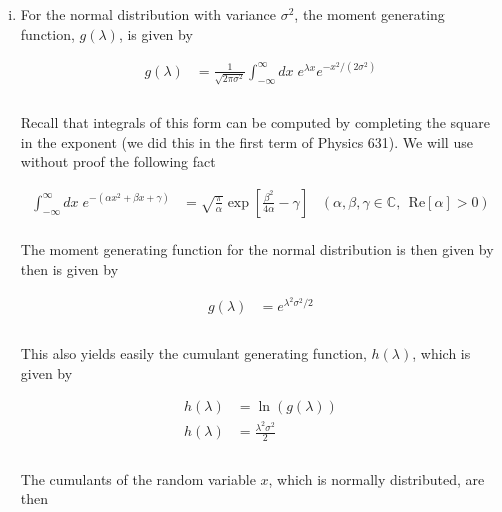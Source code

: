 \documentclass[]{article}
\begin{document}
\begin{enumerate}[i.]
\item For the normal distribution with variance $\sigma^2$, the moment generating function, $g(\lambda)$, is given by

\begin{equation}
\begin{aligned}
g( \lambda ) & = \frac{1}{  \sqrt{ 2 \pi \sigma^2} }\int_{-\infty}^{\infty} dx \; e^{ \lambda x} e^{- x^2/ (2\sigma^2)} \\
\end{aligned}
\end{equation}\\

Recall that integrals of this form can be computed by completing the square in the exponent (we did this in the first term of Physics 631). We will use without proof the following fact

\begin{equation}
\begin{aligned}
\int_{-\infty}^{\infty} dx \; e^{ - (\alpha x^2 + \beta x + \gamma)} & = \sqrt{ \frac{\pi}{\alpha} } \exp\left[ \frac{\beta^2}{4\alpha} - \gamma  \right] \; \; \; (\alpha, \beta, \gamma \in \mathbb{C} \text{, } \; \text{Re}\left[ \alpha \right] > 0)
\end{aligned}
\end{equation}\\

The moment generating function for the normal distribution is then given by then is given by

\begin{equation}
\begin{aligned}
g( \lambda ) & = e^{ \lambda^2 \sigma^2 / 2 } \\
\end{aligned}
\end{equation}\\

This also yields easily the cumulant generating function, $h(\lambda)$, which is given by

\begin{equation}
\begin{aligned}
h( \lambda ) & = \ln( g(\lambda ) ) \\
h(\lambda) & = \frac{ \lambda^2 \sigma^2 }{ 2 } \\
\end{aligned}
\end{equation}\\

The cumulants of the random variable $x$, which is normally distributed, are then


\end{enumerate}
\end{document}
